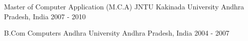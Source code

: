 


\begin{cventries}


\cventry
{Master of Computer Application (M.C.A)} %
{JNTU Kakinada University} %
{Andhra Pradesh, India} %
{2007 - 2010} %
{ %
}

\cventry
{B.Com Computers} %
{Andhra University} %
{Andhra Pradesh, India} %
{2004 - 2007} %
{ %
}


\end{cventries}